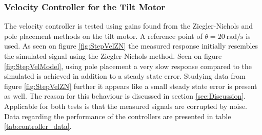 \documentclass[../../main.tex]{subfiles}
\begin{document}
\subsubsection*{Velocity Controller for the Tilt Motor}
The velocity controller is tested using gains found from the Ziegler-Nichols and pole placement methods on the tilt motor. A reference point of $\Dot{\theta}=\SI{20}{\radian \per \second}$ is used. As seen on figure \ref{fig:StepVelZN} the measured response initially resembles the simulated signal using the Ziegler-Nichols method. Seen on figure \ref{fig:StepVelModel}, using pole placement a very slow response compared to the simulated is achieved in addition to a steady state error. Studying data from figure \ref{fig:StepVelZN} further it appears like a small steady state error is present as well. The reason for this behaviour is discussed in section \ref{sec:Discussion}. Applicable for both tests is that the measured signals are corrupted by noise. Data regarding the performance of the controllers are presented in table \ref{tab:controller_data}.
\end{document}
